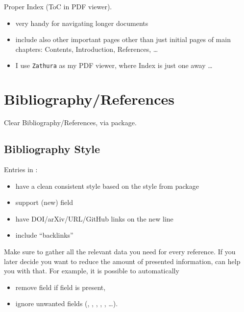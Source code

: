 Proper Index (ToC in PDF viewer).
\begin{itemize}
    \item very handy for navigating longer documents
    \item include also other important pages other than just initial pages of main chapters: Contents, Introduction, References, \ldots
    \item I use \texttt{Zathura} as my PDF viewer, where Index is just one  away \ldots
\end{itemize}


\section{Bibliography/References}%
\label{sec:Bibliography/References}

Clear Bibliography/References, via  package.

\subsection{Bibliography Style}%
\label{sub:Bibliography Style}

Entries in :
\begin{itemize}
    \item have a clean consistent style based on the  style from  package
    \item support (new)  field
    \item have DOI/arXiv/URL/GitHub links on the new line
    \item include \enquote{backlinks}
\end{itemize}

\begin{remark}
    Make sure to gather all the relevant data you need for every reference.
    If you later decide you want to reduce the amount of presented information,  can help you with that.
    For example, it is possible to automatically
    \begin{itemize}
        \item remove  field if  field is present,
        \item ignore unwanted fields (, , , , , \ldots). \qedhere*
    \end{itemize}
\end{remark}

